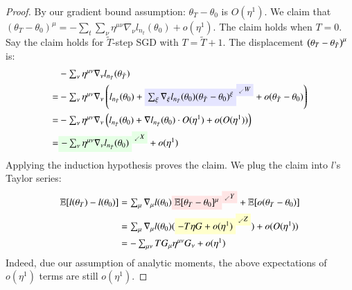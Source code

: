     \begin{proof} %
        By our gradient bound assumption: $\theta_T - \theta_0$ is $O(\eta^1)$.
        We {claim} that $(\theta_T - \theta_0)^\mu =
        -\sum_t \sum_\nu \eta^{\mu\nu} \nabla_\nu l_{n_t}(\theta_0) + o(\eta^1)$.
        The claim holds when $T=0$.  Say the claim holds for
        ${\tilde T}$-step SGD with
        $T = {\tilde T}+1$.  The displacement
        $\left(\theta_{T} - \theta_{{\tilde T}}\right)^\mu$
        is:%
        \begin{align*}
               & - \textstyle\sum_{\nu} \eta^{\mu\nu} \nabla_\nu l_{n_{\tilde T}}(\theta_{{\tilde T}})   
            \\=& - \textstyle\sum_{\nu} \eta^{\mu\nu} \nabla_\nu \wrap{
                       l_{n_{\tilde T}}(\theta_0)
                       + \text{\translucent{moosky}{$\sum_{\xi} \nabla_\xi l_{n_{\tilde T}}(\theta_0) (\theta_{{\tilde T}} - \theta_0)^\xi$}}^{\text{\translucent{moosky}{$_\swarrow W$}}}
                       + o(\theta_{{\tilde T}} - \theta_0)
                   }    
            \\=& - \textstyle\sum_{\nu} \eta^{\mu\nu} \nabla_\nu \wrap{
                          l_{n_{\tilde T}}(\theta_0)
                          + \nabla l_{n_{\tilde T}}(\theta_0) \cdot O(\eta^1) + o(O(\eta^1))
                      }    
            \\=& \textstyle\text{\translucent{moolime}{$- \sum_\nu \eta^{\mu\nu} \nabla_\nu l_{n_{\tilde T}}(\theta_0)$}}^{\text{\translucent{moolime}{$_\swarrow X$}}}
            + o(\eta^1)
        \end{align*}
        Applying the induction hypothesis proves the claim.
        We plug the claim into $l$'s Taylor series:
        \begin{align*}
            \expc[l(\theta_T) - l(\theta_0)]
            &= \textstyle \sum_\mu \nabla_\mu l(\theta_0)
              \text{\translucent{moopink}{$\expc[\theta_T - \theta_0]^\mu$}}^{\text{\translucent{moopink}{$_\swarrow Y$}}}
              + \expc[o(\theta_T - \theta_0)] \\
            &= \textstyle \sum_\mu \nabla_\mu l(\theta_0) (%
              \text{\translucent{moogold}{$-T\eta G + o(\eta^1)$}}^{\text{\translucent{moogold}{$_\swarrow Z$}}})
              + o(O(\eta^1)) \\
            &= \textstyle - \sum_{\mu\nu} T G_\mu \eta^{\mu\nu} G_\nu + o(\eta^1)
        \end{align*}
        Indeed, due our assumption of analytic moments, the above
        expectations of $o(\eta^1)$ terms are still $o(\eta^1)$.
    \end{proof}

